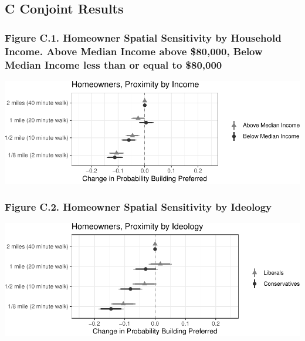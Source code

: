 \documentclass[]{article}
\begin{document}
\hypertarget{c-conjoint-results}{%
\subsection{C Conjoint Results}\label{c-conjoint-results}}

\hypertarget{figure-c.1.-homeowner-spatial-sensitivity-by-household-income.-above-median-income-above-80000-below-median-income-less-than-or-equal-to-80000}{%
\subsubsection{Figure C.1. Homeowner Spatial Sensitivity by Household Income. Above Median Income above \$80,000, Below Median Income less than or equal to \$80,000}\label{figure-c.1.-homeowner-spatial-sensitivity-by-household-income.-above-median-income-above-80000-below-median-income-less-than-or-equal-to-80000}}

\includegraphics{Zheng-Ruth-Renters-Paper_files/figure-latex/Figure C.1 print-1.pdf}

\hypertarget{figure-c.2.-homeowner-spatial-sensitivity-by-ideology}{%
\subsubsection{Figure C.2. Homeowner Spatial Sensitivity by Ideology}\label{figure-c.2.-homeowner-spatial-sensitivity-by-ideology}}

\includegraphics{Zheng-Ruth-Renters-Paper_files/figure-latex/Figure C2 print-1.pdf}
\end{document}
